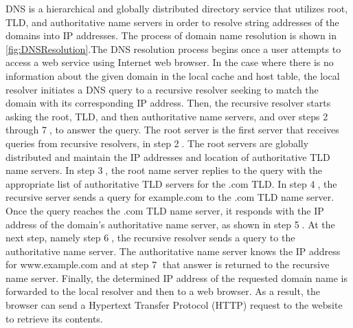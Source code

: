 DNS is a hierarchical and globally distributed directory service that utilizes root, TLD, and authoritative name servers in order to resolve string addresses of the domains into IP addresses. The process of domain name resolution is shown in \autoref{fig:DNSResolution}.The DNS resolution process begins once a user attempts to access a web service using Internet web browser. In the case where there is no information about the given domain in the local cache and host table, the local resolver initiates a DNS query to a recursive resolver seeking to match the domain with its corresponding IP address. Then, the recursive resolver starts asking the root, TLD, and then authoritative name servers, and over steps \textcircled{\tiny 2} through \textcircled{\tiny 7}, to answer the query. The root server is the first server that receives queries from recursive resolvers, in step \textcircled{\tiny 2}. The root servers are globally distributed and maintain the IP addresses and location of authoritative TLD name servers. In step \textcircled{\tiny 3}, the root name server replies to the query with the appropriate list of authoritative TLD servers for the .com TLD. In step \textcircled{\tiny 4}, the recursive server sends a query for example.com to the .com TLD name server. Once the query reaches the .com TLD name server, it responds with the IP address of the domain's authoritative name server, as shown in step \textcircled{\tiny 5}. At the next step, namely step \textcircled{\tiny 6}, the recursive resolver sends a query to the authoritative name server. The authoritative name server knows the IP address for www.example.com and at step \textcircled{\tiny 7} that answer is returned to the recursive name server. Finally, the determined IP address of the requested domain name is forwarded to the local resolver and then to a web browser. As a result, the browser can send a Hypertext Transfer Protocol (HTTP) request to the website to retrieve its contents. 
